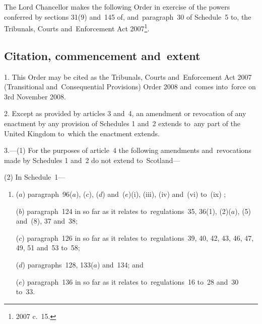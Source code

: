 \documentclass[12pt,a4paper]{article}
\title{\regstitle}
\author{S.I.\ 2008 No.\ 2683}
\date{Made
9th October 2008\\
Laid before Parliament
15th October 2008\\
Coming into~force
3rd November 2008
}
\begin{document}
\maketitle

\noindent
The Lord Chancellor makes the following Order in exercise of the powers conferred by sections 31(9) and~145 of, and~paragraph~30 of Schedule~5 to, the Tribunals, Courts and~Enforcement Act 2007\footnote{2007 c.~15.}. 

{\sloppy

\tableofcontents

}

\bigskip

\setcounter{secnumdepth}{-2}

\subsection[1--4. Citation, commencement and~extent]{Citation, commencement and~extent}

1.  This Order may be cited as the Tribunals, Courts and~Enforcement Act 2007 (Transitional and~Consequential Provisions) Order 2008 and~comes into~force on 3rd November 2008.

\medskip

2.  Except as provided by articles 3 and~4, an amendment or revocation of any enactment by any provision of Schedules 1 and~2 extends to~any part of the United Kingdom to~which the enactment extends.

\medskip

3.---(1)  For the purposes of article~4 the following amendments and~revocations made by Schedules 1 and~2 do not extend to~Scotland—

(2) In Schedule~1—
\begin{enumerate}\item[]
($a$) paragraph~96($a$), ($c$), ($d$)  and~($e$)(i), (iii), (iv)  and~(vi)  to~(ix) ;

($b$) paragraph~124 in so far as it relates to~regulations~35, 36(1), (2)($a$), (5) and~(8), 37 and~38;

($c$) paragraph~126 in so far as it relates to~regulations~39, 40, 42, 43, 46, 47, 49, 51 and~53 to~58;

($d$) paragraphs~128, 133($a$)  and~134; and

($e$) paragraph~136 in so far as it relates to~regulations~16 to~28 and~30 to~33.
\end{enumerate}
\end{document}
